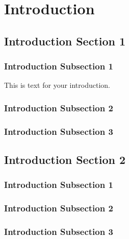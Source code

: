 \chapter{Introduction}

\section{Introduction Section 1}

\subsection{Introduction Subsection 1}
This is text for your introduction.
\subsection{Introduction Subsection 2}
\subsection{Introduction Subsection 3}


\section{Introduction Section 2}

\subsection{Introduction Subsection 1}
\subsection{Introduction Subsection 2}
\subsection{Introduction Subsection 3}
